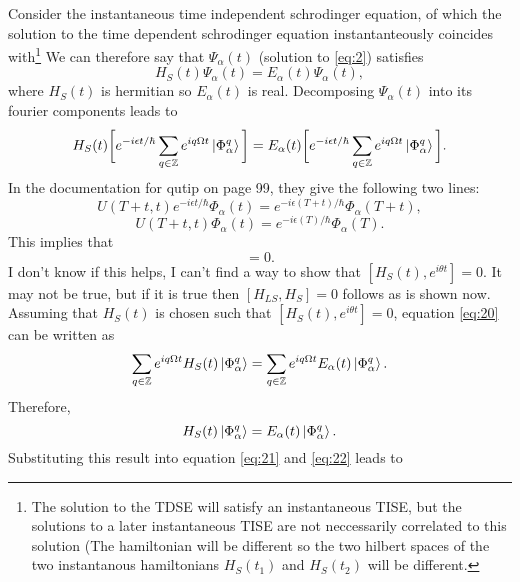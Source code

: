 \documentclass[10pt]{article}
\numberwithin{equation}{section}
\begin{document}
Consider the instantaneous time independent schrodinger equation, of which the solution to the time dependent schrodinger equation instantanteously coincides with\footnote{The solution to the TDSE will satisfy an instantaneous TISE, but the solutions to a later instantaneous TISE are not neccessarily correlated to this solution (The hamiltonian will be different so the two hilbert spaces of the two instantanous hamiltonians $H_{S}(t_{1})$ and $H_{S}(t_{2})$ will be different.} We can therefore say that $\Psi_{\alpha}(t)$ (solution to \ref{eq:2}) satisfies
\begin{equation}
H_{S}(t)\Psi_{\alpha}(t) = E_{\alpha}(t) \Psi_{\alpha}(t), 
\end{equation}
where $H_{S}(t)$ is hermitian so $E_{\alpha}(t)$ is real. Decomposing $\Psi_{\alpha}(t)$ into its fourier components leads to
\begin{equation} \label{eq:20}
H_{S}(t)\bigg[e^{-i\epsilon t/\hbar}\sum_{q \in\mathbb{Z}}e^{iq\Omega t} \ket{\Phi_{\alpha}^{q}} \bigg]  = E_{\alpha}(t)\bigg[e^{-i\epsilon t/\hbar}\sum_{q \in\mathbb{Z}}e^{iq\Omega t} \ket{\Phi_{\alpha}^{q}}   \bigg].
\end{equation}
In the documentation for qutip on page 99, they give the following two lines:
\begin{equation}
U(T+t,t)e^{-i\epsilon t/\hbar}\Phi_{\alpha}(t) = e^{-i\epsilon (T+t)/\hbar}\Phi_{\alpha}(T+t),
\end{equation}
\begin{equation}
U(T+t,t)\Phi_{\alpha}(t) = e^{-i\epsilon (T)/\hbar}\Phi_{\alpha}(T).
\end{equation}
This implies that 
\begin{equation}
[U(T+t,t),e^{i\theta t}] = 0.
\end{equation}
I don't know if this helps, I can't find a way to show that $[H_{S}(t),e^{i\theta t}] = 0$. It may not be true, but if it is true then  $[H_{LS},H_{S}] = 0$ follows as is shown now.
Assuming that $H_{S}(t)$ is chosen such that $[H_{S}(t),e^{i\theta t}] = 0$, equation \ref{eq:20} can be written as
\begin{equation}
\sum_{q \in\mathbb{Z}}e^{iq\Omega t} H_{S}(t)\ket{\Phi_{\alpha}^{q}} =\sum_{q \in\mathbb{Z}}e^{iq\Omega t} E_{\alpha}(t)\ket{\Phi_{\alpha}^{q}}.
\end{equation}
Therefore,
\begin{equation}
H_{S}(t)\ket{\Phi_{\alpha}^{q}} = E_{\alpha}(t)\ket{\Phi_{\alpha}^{q}}.
\end{equation}
Substituting this result into equation \ref{eq:21} and \ref{eq:22} leads to 
\end{document}
